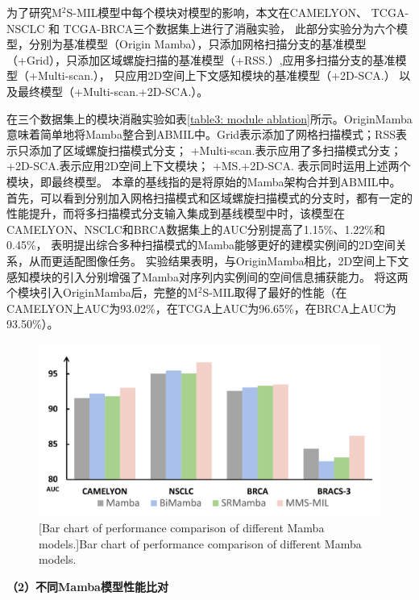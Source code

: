 为了研究M$^2$S-MIL模型中每个模块对模型的影响，本文在CAMELYON、 TCGA-NSCLC 和 TCGA-BRCA三个数据集上进行了消融实验，
此部分实验分为六个模型，分别为基准模型（Origin Mamba），只添加网格扫描分支的基准模型（+Grid），只添加区域螺旋扫描的基准模型（+RSS.）,应用多扫描分支的基准模型（+Multi-scan.），
只应用2D空间上下文感知模块的基准模型（+2D-SCA.） 以及最终模型（+Multi-scan.+2D-SCA.）。

在三个数据集上的模块消融实验如表\ref{table3: module ablation}所示。OriginMamba意味着简单地将Mamba整合到ABMIL中。Grid表示添加了网格扫描模式；RSS表示只添加了区域螺旋扫描模式分支；
+Multi-scan.表示应用了多扫描模式分支；+2D-SCA.表示应用2D空间上下文模块； +MS.+2D-SCA. 表示同时运用上述两个模块，即最终模型。
本章的基线指的是将原始的Mamba架构合并到ABMIL中。
首先，可以看到分别加入网格扫描模式和区域螺旋扫描模式的分支时，都有一定的性能提升，而将多扫描模式分支输入集成到基线模型中时，该模型在CAMELYON、NSCLC和BRCA数据集上的AUC分别提高了1.15\%、1.22\%和0.45\%，
表明提出综合多种扫描模式的Mamba能够更好的建模实例间的2D空间关系，从而更适配图像任务。
实验结果表明，与OriginMamba相比，2D空间上下文感知模块的引入分别增强了Mamba对序列内实例间的空间信息捕获能力。
将这两个模块引入OriginMamba后，完整的M$^2$S-MIL取得了最好的性能（在CAMELYON上AUC为93.02\%，在TCGA上AUC为96.65\%，在BRCA上AUC为93.50\%）。

\begin{figure}[ht]
  \centering
  \includegraphics[width=0.9\columnwidth]{figures/MMSMIL的不同Mamba比较.pdf}
  [Bar chart of performance comparison of different Mamba models.]{Bar chart of performance comparison of different Mamba models.}
  \label{figure3: DifferentMamba}
\end{figure}
\textbf{（2）不同Mamba模型性能比对}




